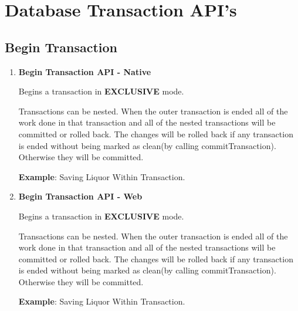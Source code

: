 \section{Database Transaction API's}

	\subsection{Begin Transaction}

		\begin{enumerate}

			\item \small \textbf{Begin Transaction API - Native}
				

				\par
				Begins a transaction in \textbf{EXCLUSIVE} mode.

				\par
				Transactions can be nested. When the outer transaction is ended all of the work done in that transaction and all of the nested transactions will be committed or rolled back. The changes will be rolled back if any transaction is ended without being marked as clean(by calling commitTransaction). Otherwise they will be committed.

				\par
					\textbf{Example}: Saving Liquor Within Transaction.
						



			\item \small \textbf{Begin Transaction API - Web}
				

				\par
				Begins a transaction in \textbf{EXCLUSIVE} mode.

				\par
				Transactions can be nested. When the outer transaction is ended all of the work done in that transaction and all of the nested transactions will be committed or rolled back. The changes will be rolled back if any transaction is ended without being marked as clean(by calling commitTransaction). Otherwise they will be committed.

				\par
					\textbf{Example}: Saving Liquor Within Transaction.
						

		\end{enumerate}


